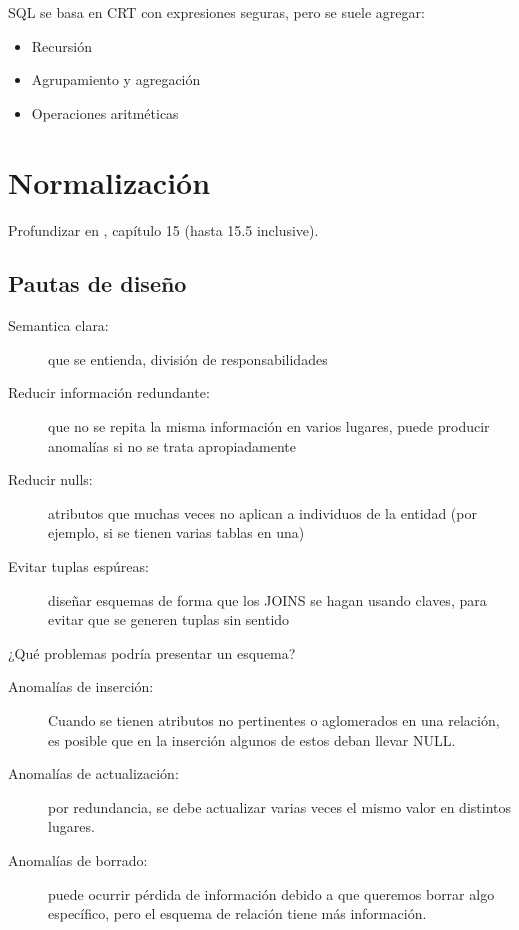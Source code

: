 SQL se basa en CRT con expresiones seguras, pero se suele agregar:

\begin{itemize}
	\item Recursión
	\item Agrupamiento y agregación
	\item Operaciones aritméticas
\end{itemize}

\section{Normalización}

Profundizar en \cite{elmasri2015}, capítulo 15 (hasta 15.5 inclusive).

\subsection{Pautas de diseño}

\begin{description}
	\item[Semantica clara:] que se entienda, división de responsabilidades
	\item[Reducir información redundante:] que no se repita la misma información en varios lugares, puede producir anomalías si no se trata apropiadamente
	\item[Reducir nulls:] atributos que muchas veces no aplican a individuos de la entidad (por ejemplo, si se tienen varias tablas en una)
	\item[Evitar tuplas espúreas:] diseñar esquemas de forma que los JOINS se hagan usando claves, para evitar que se generen tuplas sin sentido
\end{description}

¿Qué problemas podría presentar un esquema?

\begin{description}
	\item[Anomalías de inserción:] Cuando se tienen atributos no pertinentes o aglomerados en una relación, es posible que en la inserción algunos de estos deban llevar NULL.
	\item[Anomalías de actualización:] por redundancia, se debe actualizar varias veces el mismo valor en distintos lugares.
	\item[Anomalías de borrado:] puede ocurrir pérdida de información debido a que queremos borrar algo específico, pero el esquema de relación tiene más información.
\end{description}

